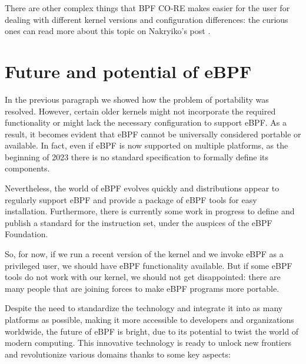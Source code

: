 There are other complex things that BPF CO-RE makes easier for the user for dealing with different kernel versions and configuration differences: the curious ones can read more about this topic on Nakryiko's post \cite{ANCOREPost}.

\section{Future and potential of eBPF}

In the previous paragraph we showed how the problem of portability was resolved.
However, certain older kernels might not incorporate the required functionality or might lack the necessary configuration to support eBPF. 
As a result, it becomes evident that eBPF cannot be universally considered portable or available.
In fact, even if eBPF is now supported on multiple platforms, as the beginning of 2023 there is no standard specification to formally define its components. 

Nevertheless, the world of eBPF evolves quickly and distributions appear to regularly support eBPF and provide a package of eBPF tools for easy installation. 
Furthermore, there is currently some work in progress to define and publish a standard for the instruction set, under the auspices of the eBPF Foundation.

So, for now, if we run a recent version of the kernel and we invoke eBPF as a privileged user, we should have eBPF functionality available.
But if some eBPF tools do not work with our kernel, we should not get disappointed: there are many people that are joining forces to make eBPF programs more portable.

Despite the need to standardize the technology and integrate it into as many platforms as possible, making it more accessible to developers and organizations worldwide, the future of eBPF is bright, due to its potential to twist the world of modern computing.
This innovative technology is ready to unlock new frontiers and revolutionize various domains thanks to some key aspects:

